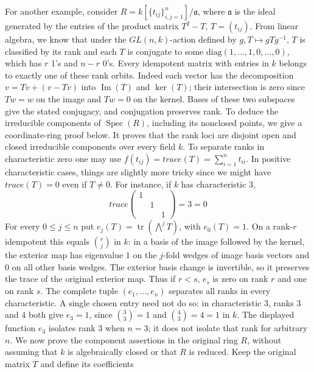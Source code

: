 \begin{example}
\label{example-idempotent-matrices}
For another example, consider
$R = k[\{t_{ij}\}_{i, j = 1}^{n}]/\mathfrak a$, where $\mathfrak a$ is
the ideal generated by the entries of the product matrix $T^2-T$,
$T = (t_{ij})$. From linear algebra, we know that under the
$GL(n, k)$-action defined by $g, T \mapsto gTg^{-1}$, $T$ is
classified by its rank and each $T$ is conjugate to some
$\text{diag}(1, \ldots, 1, 0, \ldots, 0)$, which has $r$ 1's and $n-r$ 0's.
Every idempotent matrix with entries in $k$ belongs to exactly one
of these rank orbits. Indeed each vector has the decomposition
$v=Tv+(v-Tv)$ into $\operatorname{Im}(T)$ and $\ker(T)$;
their intersection is zero since $Tw=w$ on the image and $Tw=0$
on the kernel. Bases of these two subspaces give the stated
conjugacy, and conjugation preserves rank. To deduce the irreducible
components of $\operatorname{Spec}(R)$, including its nonclosed
points, we give a coordinate-ring proof below. It proves that the
rank loci are disjoint open and closed irreducible components over
every field $k$. To separate ranks in characteristic zero one may use
$f(t_{ij}) = trace(T) = \sum_{i = 1}^nt_{ii}$. In positive
characteristic cases, things are slightly more tricky since we
might have $trace(T) = 0$ even if $T \neq 0$. For instance, if $k$ has characteristic $3$,
$$
trace\left(
\begin{matrix}
1 & & \\
& 1 & \\
& & 1
\end{matrix}
\right) = 3 = 0
$$
For every $0\leq j\leq n$ put
$e_j(T)=\operatorname{tr}(\bigwedge^jT)$, with $e_0(T)=1$.
On a rank-$r$ idempotent this equals $\binom rj$ in $k$:
in a basis of the image followed by the kernel, the exterior map
has eigenvalue $1$ on the $j$-fold wedges of image basis vectors
and $0$ on all other basis wedges. The exterior basis change is
invertible, so it preserves the trace of the original exterior map.
Thus if $r<s$, $e_s$ is zero on rank $r$ and one on rank $s$.
The complete tuple $(e_1,\ldots,e_n)$ separates all ranks in every
characteristic. A single chosen entry need not do so: in
characteristic $3$, ranks $3$ and $4$ both give $e_3=1$, since
$\binom33=1$ and $\binom43=4=1$ in $k$.
The displayed function $e_3$ isolates rank $3$ when $n=3$;
it does not isolate that rank for arbitrary $n$.
\medskip\noindent
We now prove the component assertions in the original ring $R$,
without assuming that $k$ is algebraically closed or that $R$ is
reduced. Keep the original matrix $T$ and define its coefficients

\end{example}
